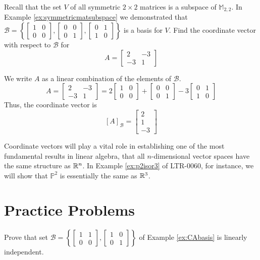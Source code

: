 \documentclass{ximera}
\begin{document}
\begin{example}\label{ex:symmmatsubspace}
Recall that the set $V$ of all symmetric $2\times 2$ matrices is a subspace of $\mathbb{M}_{2,2}$.  In Example \ref{ex:symmetricmatsubspace} we demonstrated that $\mathcal{B} = \left\{
\begin{bmatrix}
1 & 0 \\
0 & 0
\end{bmatrix}, \begin{bmatrix}
0 & 0 \\
0 & 1
\end{bmatrix}, \begin{bmatrix}
0 & 1 \\
1 & 0
\end{bmatrix}
\right\}$ is a basis for $V$.  Find the coordinate vector with respect to $\mathcal{B}$ for 
$$A=\begin{bmatrix}2&-3\\-3&1\end{bmatrix}$$
\begin{explanation}
We write $A$ as a linear combination of the elements of $\mathcal{B}$.
$$A=\begin{bmatrix}2&-3\\-3&1\end{bmatrix}=2\begin{bmatrix}1&0\\0&0\end{bmatrix}+\begin{bmatrix}
0 & 0 \\
0 & 1
\end{bmatrix}-3\begin{bmatrix}
0 & 1 \\
1 & 0
\end{bmatrix}$$
Thus, the coordinate vector is
$$[A]_{\mathcal{B}}=\begin{bmatrix}2\\1\\-3\end{bmatrix}$$
\end{explanation}
\end{example}


Coordinate vectors will play a vital role in establishing one of the most fundamental results in linear algebra, that all $n$-dimensional vector spaces have the same structure as $\mathbb{R}^n$.  In Example \ref{ex:p2isor3} of LTR-0060, for instance, we will show that $\mathbb{P}^2$ is essentially the same as $\mathbb{R}^3$.  


\section*{Practice Problems}
\begin{problem}\label{prob:CABlinind}
Prove that set $\mathcal{B}=\left\{\begin{bmatrix}1&1\\0&0\end{bmatrix},\begin{bmatrix}1&0\\0&1\end{bmatrix}\right\}$ of Example \ref{ex:CAbasis} is linearly independent.
\end{problem}
\end{document}
